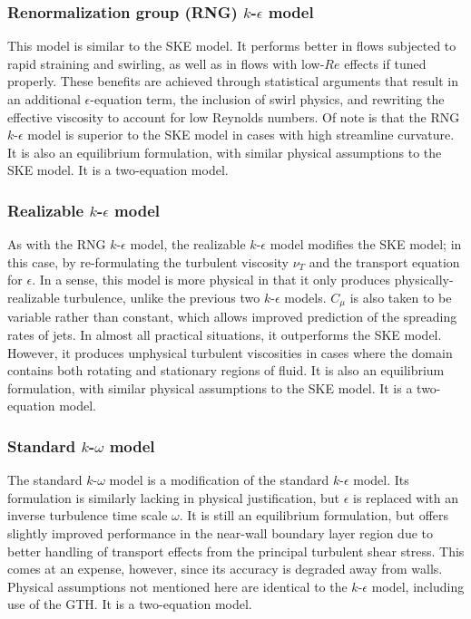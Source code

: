 \documentclass[11pt]{article}
\begin{document}
\subsubsection{Renormalization group (RNG) $k$-$\epsilon$ model}

This model is similar to the SKE model. It performs better in flows subjected to rapid straining and swirling, as well as in flows with low-$Re$ effects if tuned properly. These benefits are achieved through statistical arguments that result in an additional $\epsilon$-equation term, the inclusion of swirl physics, and rewriting the effective viscosity to account for low Reynolds numbers. Of note is that the RNG $k$-$\epsilon$ model is superior to the SKE model in cases with high streamline curvature. It is also an equilibrium formulation, with similar physical assumptions to the SKE model. It is a two-equation model.

\subsubsection{Realizable $k$-$\epsilon$ model}

As with the RNG $k$-$\epsilon$ model, the realizable $k$-$\epsilon$ model modifies the SKE model; in this case, by re-formulating the turbulent viscosity $\nu_T$ and the transport equation for $\epsilon$. In a sense, this model is more physical in that it only produces physically-realizable turbulence, unlike the previous two $k$-$\epsilon$ models. $C_\mu$ is also taken to be variable rather than constant, which allows improved prediction of the spreading rates of jets. In almost all practical situations, it outperforms the SKE model. However, it produces unphysical turbulent viscosities in cases where the domain contains both rotating and stationary regions of fluid. It is also an equilibrium formulation, with similar physical assumptions to the SKE model. It is a two-equation model.

\subsubsection{Standard $k$-$\omega$ model}

The standard $k$-$\omega$ model is a modification of the standard $k$-$\epsilon$ model. Its formulation is similarly lacking in physical justification, but $\epsilon$ is replaced with an inverse turbulence time scale $\omega$. It is still an equilibrium formulation, but offers slightly improved performance in the near-wall boundary layer region due to better handling of transport effects from the principal turbulent shear stress. This comes at an expense, however, since its accuracy is degraded away from walls. Physical assumptions not mentioned here are identical to the $k$-$\epsilon$ model, including use of the GTH. It is a two-equation model.
\end{document}
